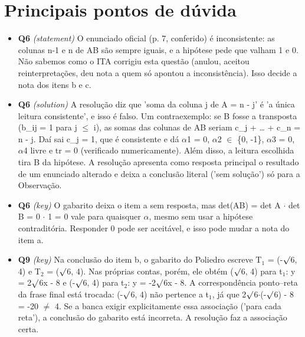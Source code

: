 \documentclass{article}%
\begin{document}
\section*{Principais pontos de dúvida}%
\begin{itemize}%
\item%
\textbf{Q6} \textit{(statement)} O enunciado oficial (p. 7, conferido) é inconsistente: as colunas n-1 e n de AB são sempre iguais, e a hipótese pede que valham 1 e 0. Não sabemos como o ITA corrigiu esta questão (anulou, aceitou reinterpretações, deu nota a quem só apontou a inconsistência). Isso decide a nota dos itens b e c.%
\item%
\textbf{Q6} \textit{(solution)} A resolução diz que 'soma da coluna j de A = n - j' é 'a única leitura consistente', e isso é falso. Um contraexemplo: se B fosse a transposta (b\_ij = 1 para j $\leq$ i), as somas das colunas de AB seriam c\_j + \ldots{} + c\_n = n - j. Daí sai c\_j = 1, que é consistente e dá $\alpha$1 = 0, $\alpha$2 $\in$ \{0, -1\}, $\alpha$3 = 0, $\alpha$4 livre e tr = 0 (verificado numericamente). Além disso, a leitura escolhida tira B da hipótese. A resolução apresenta como resposta principal o resultado de um enunciado alterado e deixa a conclusão literal ('sem solução') só para a Observação.%
\item%
\textbf{Q6} \textit{(key)} O gabarito deixa o item a sem resposta, mas det(AB) = det A $\cdot$ det B = 0 $\cdot$ 1 = 0 vale para quaisquer $\alpha$, mesmo sem usar a hipótese contraditória. Responder 0 pode ser aceitável, e isso pode mudar a nota do item a.%
\item%
\textbf{Q9} \textit{(key)} Na conclusão do item b, o gabarito do Poliedro escreve T$_{1}$ = (-$\surd$6, 4) e T$_{2}$ = ($\surd$6, 4). Nas próprias contas, porém, ele obtém ($\surd$6, 4) para t$_{1}$: y = 2$\surd$6x - 8 e (-$\surd$6, 4) para t$_{2}$: y = -2$\surd$6x - 8. A correspondência ponto--reta da frase final está trocada: (-$\surd$6, 4) não pertence a t$_{1}$, já que 2$\surd$6$\cdot$(-$\surd$6) - 8 = -20 $\neq$ 4. Se a banca exigir explicitamente essa associação ('para cada reta'), a conclusão do gabarito está incorreta. A resolução faz a associação certa.%
\end{itemize}%
\end{document}
